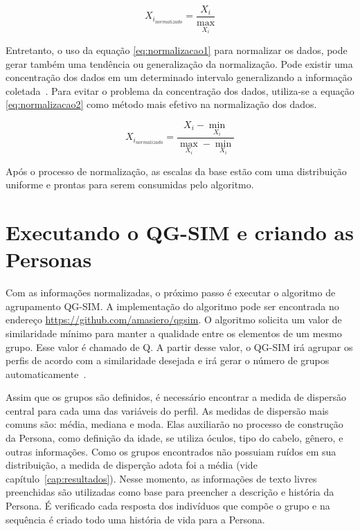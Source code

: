 \begin{equation}
	X_{i_{normalizado}} = \frac{X_i}{\max_{X_i}}
	\label{eq:normalizacao1}
\end{equation}

Entretanto, o uso da equação \ref{eq:normalizacao1} para normalizar os dados, pode gerar também uma tendência ou generalização da normalização. Pode existir uma concentração dos dados em um determinado intervalo generalizando a informação coletada~\cite{masiero:2013}. Para evitar o problema da concentração dos dados, utiliza-se a equação \ref{eq:normalizacao2} como método mais efetivo na normalização dos dados.

\begin{equation}
	X_{i_{normalizado}} = \frac{X_i - \min_{X_i}}{\max_{X_i} - \min_{X_i}}
	\label{eq:normalizacao2}
\end{equation}

Após o processo de normalização, as escalas da base estão com uma distribuição uniforme e prontas para serem consumidas pelo algoritmo.

\section{Executando o QG-SIM e criando as Personas}
\label{sec:criarpersonas}
Com as informações normalizadas, o próximo passo é executar o algoritmo de agrupamento QG-SIM. A implementação do algoritmo pode ser encontrada no endereço \url{https://github.com/amasiero/qgsim}. O algoritmo solicita um valor de similaridade mínimo para manter a qualidade entre os elementos de um mesmo grupo. Esse valor é chamado de Q. A partir desse valor, o QG-SIM irá agrupar os perfis de acordo com a similaridade desejada e irá gerar o número de grupos automaticamente~\cite{masiero:2013}.

Assim que os grupos são definidos, é necessário encontrar a medida de dispersão central para cada uma das variáveis do perfil. As medidas de dispersão mais comuns são: média, mediana e moda. Elas auxiliarão no processo de construção da Persona, como definição da idade, se utiliza óculos, tipo do cabelo, gênero, e outras informações. Como os grupos encontrados não possuiam ruídos em sua distribuição, a medida de disperção adota foi a média (vide capítulo~\ref{cap:resultados}). Nesse momento, as informações de texto livres preenchidas são utilizadas como base para preencher a descrição e história da Persona. É verificado cada resposta dos indivíduos que compõe o grupo e na sequência é criado todo uma história de vida para a Persona.

